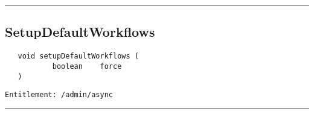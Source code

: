\rule{12cm}{2pt}
\subsection{SetupDefaultWorkflows}
\label{Api:SetupDefaultWorkflows}
\begin{Verbatim}
   void setupDefaultWorkflows (
           boolean    force
   )
\end{Verbatim}
\begin{Verbatim}[formatcom=\color{Maroon}]
  Entitlement: /admin/async
\end{Verbatim}



\rule{12cm}{2pt}
